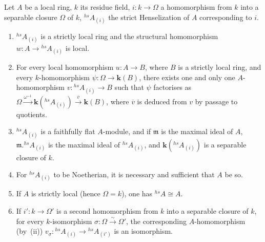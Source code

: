 \begin{proposition}[18.8.8]
\label{IV.18.8.8}
Let $A$ be a local ring, $k$ its residue field, $i:k\to\Omega$ a homomorphism from $k$ into a separable closure $\Omega$ of $k$, ${}^{hs}\!A_{(i)}$ the strict Henselization of $A$ corresponding to $i$.
\begin{enumerate}[label=\emph{\roman*)}]
  \item ${}^{hs}\!A_{(i)}$ is a strictly local ring  and the structural homomorphism $w:A\to{}^{hs}\!A_{(i)}$ is local.
  \item For every local homomorphism $u:A\to B$, where $B$ is a strictly local ring, and every $k$-homomorphism $\psi:\Omega\to\boldsymbol{k}(B)$, there exists one and only one $A$-homomorphism $v:{}^{hs}\!A_{(i)}\to B$ such that $\psi$ factorises as $\Omega\xrightarrow{\omega^{-1}}\boldsymbol{k}({}^{hs}\!A_{(i)})\xrightarrow{\overline{v}}\boldsymbol{k}(B)$, where $\overline{v}$ is deduced from $v$ by passage to quotients.
  \item ${}^{hs}\!A_{(i)}$ is a faithfully flat $A$-module, and if $\mathfrak{m}$ is the maximal ideal of $A$, $\mathfrak{m}.{}^{hs}\!A_{(i)}$ is the maximal ideal of ${}^{hs}\!A_{(i)}$, and $\boldsymbol{k}({}^{hs}\!A_{(i)})$ is a separable closure of $k$.
  \item For ${}^{hs}\!A_{(i)}$ to be Noetherian, it is necessary and sufficient that $A$ be so.
  \item If $A$ is strictly local (hence $\Omega=k$), one has ${}^{hs}\!A\cong A$.
  \item If $i':k\to\Omega'$ is a second homomorphism from $k$ into a separable closure of $k$, for every $k$-isomorphism $\sigma:\Omega\xrightarrow{\sim}\Omega'$, the corresponding $A$-homomorphism \textup{(}by~\textup{(ii))} $v_\sigma:{}^{hs}\!A_{(i)}\to{}^{hs}\!A_{(i')}$ is an isomorphism.
\end{enumerate}
\end{proposition}

